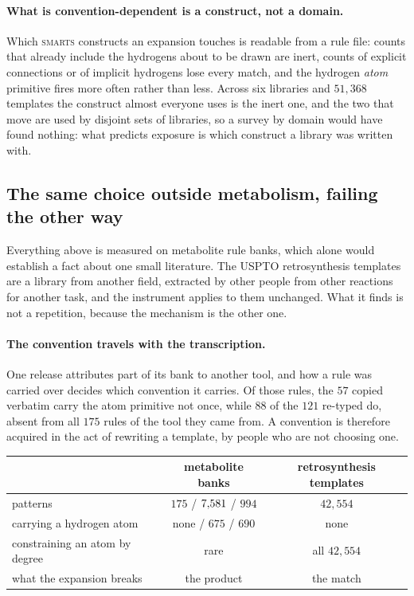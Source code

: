 \paragraph{What is convention-dependent is a construct, not a domain.} Which \textsc{smarts}
constructs an expansion touches is readable from a rule file: counts that already include the
hydrogens about to be drawn are inert, counts of explicit connections or of implicit hydrogens lose
every match, and the hydrogen \emph{atom} primitive fires more often rather than less. Across six
libraries and $51{,}368$ templates the construct almost everyone uses is the inert one, and the two
that move are used by disjoint sets of libraries, so a survey by domain would have found nothing:
what predicts exposure is which construct a library was written with.

\subsection{The same choice outside metabolism, failing the other way}
\label{app:retroconvention}

Everything above is measured on metabolite rule banks, which alone would establish a fact about
one small literature. The USPTO retrosynthesis templates are a library from another field,
extracted by other people from other reactions for another task, and the instrument applies to them
unchanged. What it finds is not a repetition, because the mechanism is the other one.

\paragraph{The convention travels with the transcription.} One release attributes part of its bank
to another tool, and how a rule was carried over decides which convention it carries. Of those
rules, the $57$ copied verbatim carry the atom primitive not once, while $88$ of the $121$ re-typed
do, absent from all $175$ rules of the tool they came from. A convention is therefore acquired in
the act of rewriting a template, by people who are not choosing one.

\begin{center}
\small
\begin{tabular}{lcc}
\toprule
& metabolite banks & retrosynthesis templates \\
\midrule
patterns                                  & $175$ / $7{,}581$ / $994$ & $42{,}554$ \\
carrying a hydrogen atom                  & none / $675$ / $690$     & none \\
constraining an atom by degree            & rare                     & all $42{,}554$ \\
what the expansion breaks                 & the product              & the match \\
\bottomrule
\end{tabular}
\end{center}

